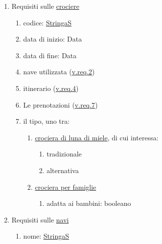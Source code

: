 \documentclass{article}
\begin{document}
\begin{enumerate}
    \item Requisiti sulle \hyperref[sec:Crociera]{crociere}\label{sec:RequisitiCrociera}
    \begin{enumerate}
        \item codice: \hyperref[sec:StringaS]{StringaS}\label{sec:RequisitiCrocieraCodice}
        \item data di inizio: Data\label{sec:RequisitiCrocieraDataInizio}
        \item data di fine: Data\label{sec:RequisitiCrocieraDataFine}
        \item nave utilizzata (\hyperref[sec:RequisitiNave]{v.req.2})\label{sec:RequisitiCrocieraNave}
        \item itinerario (\hyperref[sec:RequisitiItinerario]{v.req.4})\label{sec:RequisitiCrocieraItinerario}
        \item Le prenotazioni (\hyperref[sec:RequisitiPrenotazione]{v.req.7})\label{sec:RequisitiCrocieraPrenotazioni}
        \item il tipo, uno tra:\label{sec:RequisitiCrocieraTipo}
        \begin{enumerate}
            \item \hyperref[sec:Croc_luna_di_miele]{crociera di luna di miele}, di cui interessa:\label{sec:RequisitiCrocieraTipoLunaDiMiele}
            \begin{enumerate}
                \item tradizionale\label{sec:RequisitiCrocieraTipoLunaDiMieleTradizionale}
                \item alternativa\label{sec:RequisitiCrocieraTipoLunaDiMieleAlternativa}
            \end{enumerate}
            \item \hyperref[sec:Croc_per_famiglie]{crociera per famiglie}\label{sec:RequisitiCrocieraTipoPerFamiglie}
            \begin{enumerate}
                \item adatta ai bambini: booleano\label{sec:RequisitiCrocieraTipoPerFamiglieAdattaAiBambini}
            \end{enumerate}
        \end{enumerate}
    \end{enumerate}
    \item Requisiti sulle \hyperref[sec:Nave]{navi}\label{sec:RequisitiNave}
    \begin{enumerate}
        \item nome: \hyperref[sec:StringaS]{StringaS}\label{sec:RequisitiNaveNome}

\end{enumerate}
\end{enumerate}
\end{document}
